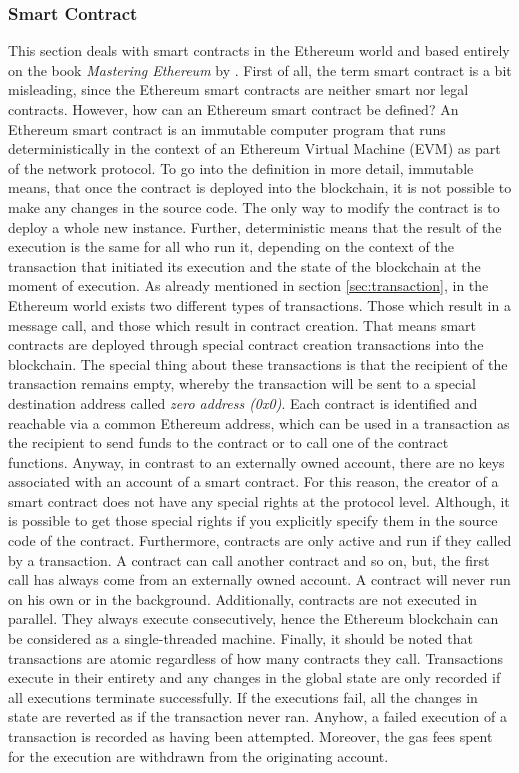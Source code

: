 \subsubsection{Smart Contract}
\label{sec:smart_contract}
This section deals with smart contracts in the Ethereum world and based 
entirely on the book \textit{Mastering Ethereum} by .
First of all, the term smart contract is a bit misleading, since the Ethereum smart contracts 
are neither smart nor legal contracts. However, how can an Ethereum smart contract be defined?
An Ethereum smart contract is an immutable computer program that runs deterministically in the context of an
Ethereum Virtual Machine (EVM) as part of the network protocol. To go into the definition in more detail, 
immutable means, that once the contract is deployed into the blockchain, it is not possible to make any
changes in the source code. The only way to modify the contract is to deploy a whole new instance. 
Further, deterministic means that the result of the execution is the same for all who run it, 
depending on the context of the transaction that initiated its execution and the state of the blockchain
at the moment of execution.
As already mentioned in section \ref{sec:transaction}, in the Ethereum world exists two different types of transactions.
Those which result in a message call, and those which result in contract creation. 
That means smart contracts are deployed through special contract creation transactions into the blockchain. 
The special thing about these transactions is that the recipient of the transaction remains empty, whereby the transaction
will be sent to a special destination address called \textit{zero address (0x0)}. Each contract is identified and reachable via
a common Ethereum address, which can be used in a transaction as the recipient to send funds to the contract or to call 
one of the contract functions. Anyway, in contrast to an externally owned account, there are no keys associated with 
an account of a smart contract. For this reason, the creator of a smart contract does not have any special rights at the 
protocol level. Although, it is possible to get those special rights if you explicitly 
specify them in the source code of the contract.
Furthermore, contracts are only active and run if they called by a transaction. 
A contract can call another contract and so on, but, 
the first call has always come from an externally owned account. 
A contract will never run on his own or in the background. Additionally, contracts are not executed in parallel.
They always execute consecutively, hence the Ethereum blockchain can be considered as a single-threaded machine. 
Finally, it should be noted that transactions are atomic regardless of how many contracts they call. Transactions execute in
their entirety and any changes in the global state are only recorded if all executions terminate successfully. 
If the executions fail, all the changes in state are reverted as if the transaction never ran. Anyhow, a failed
execution of a transaction is recorded as having been attempted. Moreover, the gas fees spent for the execution are withdrawn
from the originating account.

\clearpage